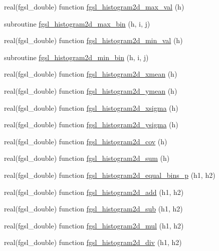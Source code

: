 \begin{DoxyCompactItemize}
\item 
real(fgsl\+\_\+double) function \hyperlink{histogram_8finc_a19b8d36f12520581d0ba6d595068ed68}{fgsl\+\_\+histogram2d\+\_\+max\+\_\+val} (h)
\item 
subroutine \hyperlink{histogram_8finc_ab1b0844796b5273d68d1d5016712ed22}{fgsl\+\_\+histogram2d\+\_\+max\+\_\+bin} (h, i, j)
\item 
real(fgsl\+\_\+double) function \hyperlink{histogram_8finc_a1ace6d2b9e54162300db8c0f6fc71a92}{fgsl\+\_\+histogram2d\+\_\+min\+\_\+val} (h)
\item 
subroutine \hyperlink{histogram_8finc_a3f4e17703f7235a66629f8c81dcd39ff}{fgsl\+\_\+histogram2d\+\_\+min\+\_\+bin} (h, i, j)
\item 
real(fgsl\+\_\+double) function \hyperlink{histogram_8finc_abc89a40b479ad73436db4b6ee9559b93}{fgsl\+\_\+histogram2d\+\_\+xmean} (h)
\item 
real(fgsl\+\_\+double) function \hyperlink{histogram_8finc_ad8cb782bcdc1619bf271be2898b9ea3a}{fgsl\+\_\+histogram2d\+\_\+ymean} (h)
\item 
real(fgsl\+\_\+double) function \hyperlink{histogram_8finc_a23f05f7ca11815e90e37cb7bc6da9327}{fgsl\+\_\+histogram2d\+\_\+xsigma} (h)
\item 
real(fgsl\+\_\+double) function \hyperlink{histogram_8finc_af14c3ceba9c1d8c6083c9514c74c9d4f}{fgsl\+\_\+histogram2d\+\_\+ysigma} (h)
\item 
real(fgsl\+\_\+double) function \hyperlink{histogram_8finc_a2d7d95fedb019b36a58a11f1af3aeeae}{fgsl\+\_\+histogram2d\+\_\+cov} (h)
\item 
real(fgsl\+\_\+double) function \hyperlink{histogram_8finc_a5063c665369dc777c289d8791e2ec53c}{fgsl\+\_\+histogram2d\+\_\+sum} (h)
\item 
real(fgsl\+\_\+double) function \hyperlink{histogram_8finc_aa38976b1d582468ebee62cffa5365aea}{fgsl\+\_\+histogram2d\+\_\+equal\+\_\+bins\+\_\+p} (h1, h2)
\item 
real(fgsl\+\_\+double) function \hyperlink{histogram_8finc_a48156dfaf1027f1683927780ecbc4fb0}{fgsl\+\_\+histogram2d\+\_\+add} (h1, h2)
\item 
real(fgsl\+\_\+double) function \hyperlink{histogram_8finc_aaff0707aaf0428c8ccb419c1b9703802}{fgsl\+\_\+histogram2d\+\_\+sub} (h1, h2)
\item 
real(fgsl\+\_\+double) function \hyperlink{histogram_8finc_a19b397da4b23893d47bc4d6aff3c9b82}{fgsl\+\_\+histogram2d\+\_\+mul} (h1, h2)
\item 
real(fgsl\+\_\+double) function \hyperlink{histogram_8finc_ac3fdc9fdc419170016f188fad746516c}{fgsl\+\_\+histogram2d\+\_\+div} (h1, h2)

\end{DoxyCompactItemize}
